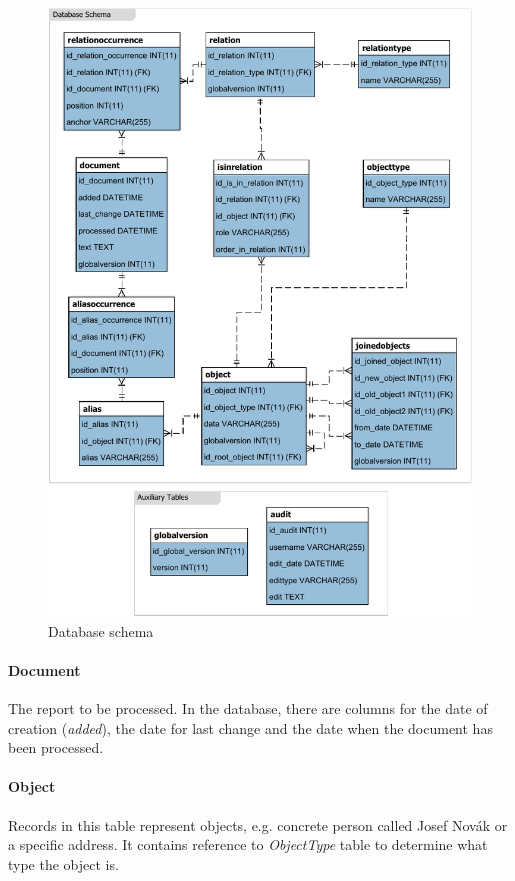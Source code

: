 \begin{figure}[!hp]
        \centering
        \includegraphics{Images/DatabaseSchema}
        \caption{Database schema}
        \label{fig:DatabaseSchema}
\end{figure}

\paragraph{Document} The report to be processed. In the database, there are
columns for the date of creation (\emph{added}), the date for last change and
the date when the document has been processed.

\paragraph{Object} Records in this table represent objects, e.g. concrete person
called Josef Novák or a specific address.  It contains reference to
\emph{ObjectType} table to determine what type the object is.


